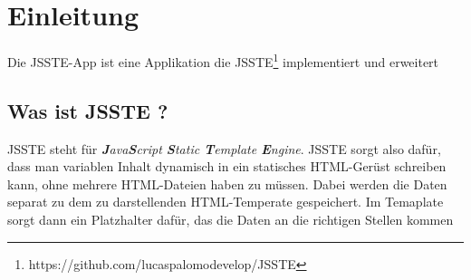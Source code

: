 \section{Einleitung}
Die JSSTE-App ist eine Applikation die JSSTE\footnote{https://github.com/lucaspalomodevelop/JSSTE} implementiert und erweitert

\subsection{Was ist JSSTE ?}

JSSTE steht für \textit{\textbf{J}ava\textbf{S}cript \textbf{S}tatic \textbf{T}emplate \textbf{E}ngine}.
JSSTE sorgt also dafür, dass man variablen Inhalt dynamisch in ein statisches HTML-Gerüst schreiben kann, ohne mehrere HTML-Dateien haben zu müssen. Dabei werden die Daten separat zu dem zu darstellenden HTML-Temperate gespeichert. 
Im Temaplate sorgt dann ein Platzhalter dafür, das die Daten an die richtigen Stellen kommen 